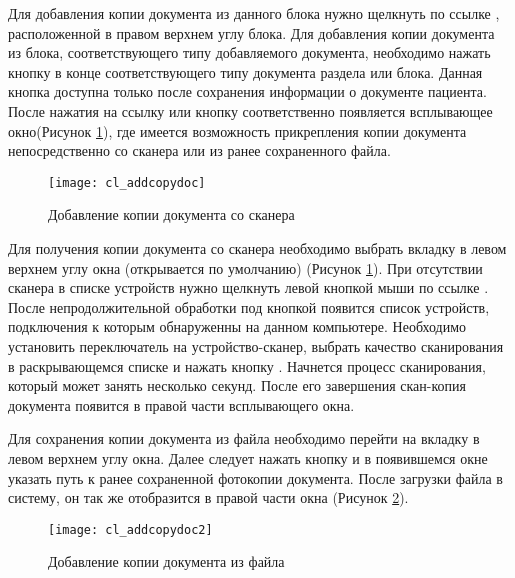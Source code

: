 {Для добавления копии документа из данного блока нужно щелкнуть по ссылке , расположенной в правом верхнем углу блока. Для добавления копии документа из блока, соответствующего типу добавляемого документа,  необходимо нажать кнопку  в конце соответствующего типу документа раздела или блока. Данная кнопка доступна только после сохранения информации о документе пациента. После нажатия на ссылку или кнопку соответственно появляется  всплывающее окно(Рисунок \ref{img_cl_addcopydoc}), где имеется возможность прикрепления копии документа непосредственно со сканера или из ранее сохраненного файла.

\begin{figure}[ht]\centering
 \texttt{[image: cl\_addcopydoc]}
 \caption{Добавление копии документа со сканера}
 \label{img_cl_addcopydoc}
\end{figure} 

Для получения копии документа со сканера необходимо выбрать вкладку  в левом верхнем углу окна (открывается по умолчанию) (Рисунок \ref{img_cl_addcopydoc}). При отсутствии сканера в списке устройств нужно щелкнуть левой кнопкой мыши по ссылке . После непродолжительной обработки под кнопкой появится список устройств, подключения к которым обнаруженны на данном компьютере. Необходимо установить переключатель на устройство-сканер, выбрать качество сканирования в раскрывающемся списке  и нажать кнопку . Начнется процесс сканирования, который может занять несколько секунд. После его завершения скан-копия документа появится в правой части всплывающего окна.

Для сохранения копии документа из файла необходимо перейти на вкладку   в левом верхнем углу окна. Далее следует нажать кнопку  и в появившемся окне указать путь к ранее сохраненной фотокопии документа. После загрузки файла в систему, он так же отобразится в правой части окна (Рисунок \ref{img_cl_addcopydoc2}).   

\begin{figure}[ht]\centering
 \texttt{[image: cl\_addcopydoc2]}
 \caption{Добавление копии документа из файла}
 \label{img_cl_addcopydoc2}
\end{figure} 

}
